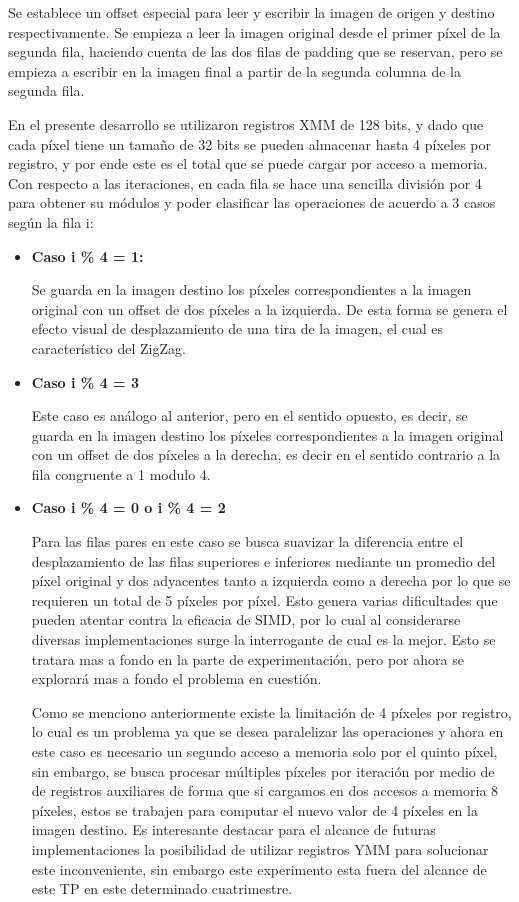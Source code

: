 \documentclass[a4paper]{article}
\begin{document}
Se establece un offset especial para leer y escribir la imagen de origen y destino respectivamente. Se empieza a leer la imagen original desde el primer píxel de la segunda fila, haciendo cuenta de las dos filas de padding que se reservan, pero se empieza a escribir en la imagen final a partir de la segunda columna de la segunda fila.

En el presente desarrollo se utilizaron registros XMM de 128 bits, y dado que cada píxel tiene un tamaño de 32 bits se pueden almacenar hasta 4 píxeles por registro, y por ende este es el total que se puede cargar por acceso a memoria. Con respecto a las iteraciones, en cada fila se hace una sencilla división por 4 para obtener su módulos y poder clasificar las operaciones de acuerdo a 3 casos según la fila i:

\begin{itemize}
\item \textbf{Caso i \% 4 = 1:}
    
Se guarda en la imagen destino los píxeles correspondientes a la imagen original con un offset de dos píxeles a la izquierda. De esta forma se genera el efecto visual de desplazamiento de una tira de la imagen, el cual es característico del ZigZag.

\item \textbf{Caso i \% 4 = 3} 
    
Este caso es análogo al anterior, pero en el sentido opuesto, es decir, se guarda en la imagen destino los píxeles correspondientes a la imagen original con un offset de dos píxeles a la derecha, es decir en el sentido contrario a la fila congruente a 1 modulo 4. 

\item \textbf{Caso i \% 4 = 0 o i \% 4 = 2}

Para las filas pares en este caso se busca suavizar la diferencia entre el desplazamiento de las filas superiores e inferiores mediante un promedio del píxel original y dos adyacentes tanto a izquierda como a derecha por lo que se requieren un total de 5 píxeles por píxel. Esto genera varias dificultades que pueden atentar contra la eficacia de SIMD, por lo cual al considerarse diversas implementaciones surge la interrogante de cual es la mejor. Esto se tratara mas a fondo en la parte de experimentación, pero por ahora se explorará mas a fondo el problema en cuestión. 

Como se menciono anteriormente existe la limitación de 4 píxeles por registro, lo cual es un problema ya que se desea paralelizar las operaciones y ahora en este caso es necesario un segundo acceso a memoria solo por el quinto píxel, sin embargo, se busca procesar múltiples píxeles por iteración por medio de de registros auxiliares de forma que si cargamos en dos accesos a memoria 8 píxeles, estos se trabajen para computar el nuevo valor de 4 píxeles en la imagen destino. Es interesante destacar para el alcance de futuras implementaciones la posibilidad de utilizar registros YMM para solucionar este inconveniente, sin embargo este experimento esta fuera del alcance de este TP en este determinado cuatrimestre.

\end{itemize}
\end{document}
